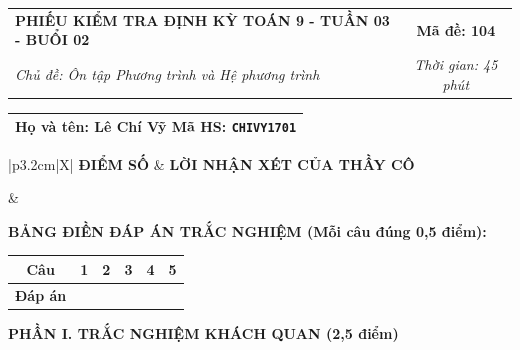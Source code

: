 \documentclass[12pt,a4paper]{article}
\begin{document}
\newpage


\noindent
\begin{tabularx}{\linewidth}{|X|c|}
\hline
\textbf{PHIẾU KIỂM TRA ĐỊNH KỲ TOÁN 9 - TUẦN 03 - BUỔI 02} & \textbf{Mã đề: 104} \\
\textit{Chủ đề: Ôn tập Phương trình và Hệ phương trình} & \textit{Thời gian: 45 phút} \\
\hline
\end{tabularx}

\vspace{1mm}

\noindent
\begin{tabularx}{\linewidth}{|X|}
\hline
\rule[-2mm]{0pt}{7.5mm}\textbf{Họ và tên:} \textbf{\large Lê Chí Vỹ} \hfill \textbf{Mã HS:} \texttt{CHIVY1701} \quad \\
\hline
\end{tabularx}

\vspace{1mm}

\noindent
\begin{tabularx}{\linewidth}{|p{3.2cm}|X|}
\hline
\centering\textbf{ĐIỂM SỐ} & \centering\textbf{LỜI NHẬN XÉT CỦA THẦY CÔ} \tabularnewline
\hline
\rule{0pt}{1.3cm} & \tabularnewline
\hline
\end{tabularx}

\vspace{1.2mm}

\noindent\textbf{BẢNG ĐIỀN ĐÁP ÁN TRẮC NGHIỆM (Mỗi câu đúng 0,5 điểm):}
\vspace{0.8mm}

\noindent
\renewcommand{\arraystretch}{1.35}
\begin{tabularx}{\linewidth}{|c|*{5}{>{\centering\arraybackslash}X|}}
\hline
\textbf{Câu} & \textbf{1} & \textbf{2} & \textbf{3} & \textbf{4} & \textbf{5} \\
\hline
\textbf{Đáp án} & & & & & \\
\hline
\end{tabularx}
\renewcommand{\arraystretch}{1.0}

\vspace{1.5mm}

\noindent\textbf{\large PHẦN I. TRẮC NGHIỆM KHÁCH QUAN (2,5 điểm)}
\vspace{1mm}
\end{document}
